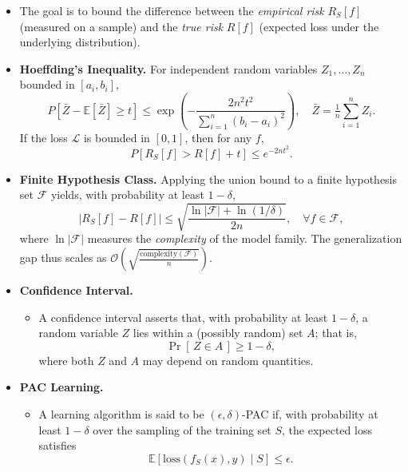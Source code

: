 \documentclass[a4paper]{article}
\begin{document}
\begin{itemize}
    \item The goal is to bound the difference between the \emph{empirical risk} $R_S[f]$ (measured on a sample) and the \emph{true risk} $R[f]$ (expected loss under the underlying distribution).

    \item \textbf{Hoeffding’s Inequality.}
    For independent random variables $Z_1, \dots, Z_n$ bounded in $[a_i, b_i]$,
    \[
    P[\bar{Z} - \mathbb{E}[\bar{Z}] \ge t]
    \le 
    \exp\!\left(-\frac{2n^2 t^2}{\sum_{i=1}^n (b_i - a_i)^2}\right),
    \quad
    \bar{Z} = \tfrac{1}{n}\sum_{i=1}^n Z_i.
    \]
    If the loss $\mathcal{L}$ is bounded in $[0,1]$, then for any $f$,
    \[
    P[R_S[f] > R[f] + t] \le e^{-2nt^2}.
    \]

    \item \textbf{Finite Hypothesis Class.}
    Applying the union bound to a finite hypothesis set $\mathcal{F}$ yields, with probability at least $1 - \delta$,
    \[
    |R_S[f] - R[f]|
    \le
    \sqrt{\frac{\ln|\mathcal{F}| + \ln(1/\delta)}{2n}},
    \quad
    \forall f \in \mathcal{F},
    \]
    where $\ln|\mathcal{F}|$ measures the \emph{complexity} of the model family. 
    The generalization gap thus scales as
    $\mathcal{O}\!\left(\sqrt{\tfrac{\text{complexity}(\mathcal{F})}{n}}\right)$.

    \item \textbf{Confidence Interval.}
        \begin{itemize}
            \item A confidence interval asserts that, with probability at least \(1 - \delta\), a random variable \(Z\) lies within a (possibly random) set \(A\); that is,
            \[
            \Pr[\, Z \in A \,] \geq 1 - \delta,
            \]
            where both \(Z\) and \(A\) may depend on random quantities.
        \end{itemize}

    \item \textbf{PAC Learning.}
        \begin{itemize}
            \item A learning algorithm is said to be \((\epsilon, \delta)\)-PAC if, with probability at least \(1 - \delta\) over the sampling of the training set \(S\), the expected loss satisfies
            \[
            \mathbb{E}[\mathrm{loss}(f_S(x), y) \mid S] \leq \epsilon.
            \]
        \end{itemize}
\end{itemize}
\end{document}
